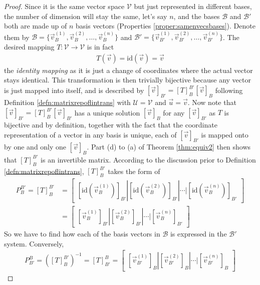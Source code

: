 \begin{proof}
Since it is the same vector space $\mathcal{V}$ but just represented in different bases, the number of dimension will stay the same, let's say $n$, and the bases $\mathcal{B}$ and $\mathcal{B}'$ both are made up of $n$ basis vectors (Properties \ref{proper:samenvecsbases}). Denote them by $\mathcal{B} = \{\vec{v}_{B}^{(1)}, \vec{v}_{B}^{(2)}, \ldots, \vec{v}_{B}^{(n)}\}$ and $\mathcal{B'} = \{\vec{v}_{B'}^{(1)}, \vec{v}_{B'}^{(2)}, \ldots, \vec{v}_{B'}^{(n)}\}$. The desired mapping $T: \mathcal{V} \to \mathcal{V}$ is in fact
\begin{align*}
T(\vec{v}) = \text{id}(\vec{v}) = \vec{v}
\end{align*}
the \textit{identity mapping} as it is just a change of coordinates where the actual vector stays identical. This transformation is then trivially bijective because any vector is just mapped into itself, and is described by $[\vec{v}]_{B'} = [T]_B^{B'} [\vec{v}]_B$ following Definition \ref{defn:matrixrepoflintrans} with $\mathcal{U} = \mathcal{V}$ and $\vec{u} = \vec{v}$. Now note that $[\vec{v}]_{B'} = [T]_B^{B'} [\vec{v}]_{B'}$ has a unique solution $[\vec{v}]_B$ for any $[\vec{v}]_{B'}$ as $T$ is bijective and by definition, together with the fact that the coordinate representation of a vector in any basis is unique, each of $[\vec{v}]_{B'}$ is mapped onto by one and only one $[\vec{v}]_B$. Part (d) to (a) of Theorem \ref{thm:equiv2} then shows that $[T]_B^{B'}$ is an invertible matrix. According to the discussion prior to Definition \ref{defn:matrixrepoflintrans}, $[T]_B^{B'}$ takes the form of
\begin{align*}
P_B^{B'} = [T]_B^{B'} &= \begin{bmatrix}
[\text{id}(\vec{v}_{B}^{(1)})]_{B'} | [\text{id}(\vec{v}_{B}^{(2)})]_{B'} | \cdots | [\text{id}(\vec{v}_{B}^{(n)})]_{B'}
\end{bmatrix} \\
&=
\begin{bmatrix}
[\vec{v}_{B}^{(1)}]_{B'} | [\vec{v}_{B}^{(2)}]_{B'} | \cdots | [\vec{v}_{B}^{(n)}]_{B'}
\end{bmatrix}
\end{align*}
So we have to find how each of the basis vectors in $\mathcal{B}$ is expressed in the $\mathcal{B}'$ system. Conversely,
\begin{align*}
P_{B'}^B = ([T]_B^{B'})^{-1} = [T]_{B'}^B =
\begin{bmatrix}
[\vec{v}_{B'}^{(1)}]_B | [\vec{v}_{B'}^{(2)}]_B | \cdots | [\vec{v}_{B'}^{(n)}]_B
\end{bmatrix}
\end{align*}
\end{proof}
